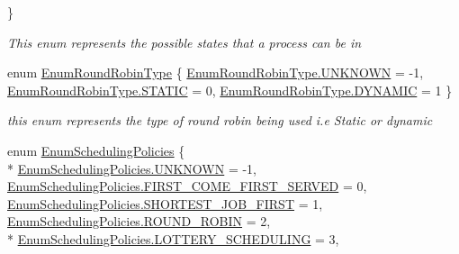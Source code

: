 \begin{DoxyCompactItemize}
 \}\begin{DoxyCompactList}\small\item\em This enum represents the possible states that a process can be in \end{DoxyCompactList}
\item 
enum \hyperlink{namespace_c_p_u___o_s___simulator_1_1_operating___system_a4c7effb8b6725df52018a3a14cede96e}{Enum\+Round\+Robin\+Type} \{ \hyperlink{namespace_c_p_u___o_s___simulator_1_1_operating___system_a4c7effb8b6725df52018a3a14cede96ea696b031073e74bf2cb98e5ef201d4aa3}{Enum\+Round\+Robin\+Type.\+U\+N\+K\+N\+O\+W\+N} = -\/1, 
\hyperlink{namespace_c_p_u___o_s___simulator_1_1_operating___system_a4c7effb8b6725df52018a3a14cede96eafe6f99ef1ec99efbdc19a9786cf1facc}{Enum\+Round\+Robin\+Type.\+S\+T\+A\+T\+I\+C} = 0, 
\hyperlink{namespace_c_p_u___o_s___simulator_1_1_operating___system_a4c7effb8b6725df52018a3a14cede96ea0fcc90da4811c877ba9f9c12f7d60bc9}{Enum\+Round\+Robin\+Type.\+D\+Y\+N\+A\+M\+I\+C} = 1
 \}\begin{DoxyCompactList}\small\item\em this enum represents the type of round robin being used i.\+e Static or dynamic \end{DoxyCompactList}
\item 
enum \hyperlink{namespace_c_p_u___o_s___simulator_1_1_operating___system_ad0cdaacf9652394d23fa29109640fe08}{Enum\+Scheduling\+Policies} \{ \\*
\hyperlink{namespace_c_p_u___o_s___simulator_1_1_operating___system_ad0cdaacf9652394d23fa29109640fe08a696b031073e74bf2cb98e5ef201d4aa3}{Enum\+Scheduling\+Policies.\+U\+N\+K\+N\+O\+W\+N} = -\/1, 
\hyperlink{namespace_c_p_u___o_s___simulator_1_1_operating___system_ad0cdaacf9652394d23fa29109640fe08ae39fb551e5657a3c31eff06f11508d59}{Enum\+Scheduling\+Policies.\+F\+I\+R\+S\+T\+\_\+\+C\+O\+M\+E\+\_\+\+F\+I\+R\+S\+T\+\_\+\+S\+E\+R\+V\+E\+D} = 0, 
\hyperlink{namespace_c_p_u___o_s___simulator_1_1_operating___system_ad0cdaacf9652394d23fa29109640fe08aa5ffbf66adc3cfaa95173a6278f573dc}{Enum\+Scheduling\+Policies.\+S\+H\+O\+R\+T\+E\+S\+T\+\_\+\+J\+O\+B\+\_\+\+F\+I\+R\+S\+T} = 1, 
\hyperlink{namespace_c_p_u___o_s___simulator_1_1_operating___system_ad0cdaacf9652394d23fa29109640fe08a1ebd8dbf8c34e255f5cbf28f35860b71}{Enum\+Scheduling\+Policies.\+R\+O\+U\+N\+D\+\_\+\+R\+O\+B\+I\+N} = 2, 
\\*
\hyperlink{namespace_c_p_u___o_s___simulator_1_1_operating___system_ad0cdaacf9652394d23fa29109640fe08aa4d25b80a5834b7f9ff2a2153f3b5985}{Enum\+Scheduling\+Policies.\+L\+O\+T\+T\+E\+R\+Y\+\_\+\+S\+C\+H\+E\+D\+U\+L\+I\+N\+G} = 3, 

\end{DoxyCompactItemize}

